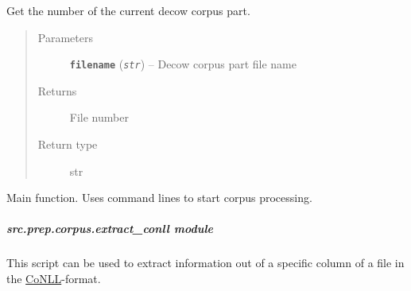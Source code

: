 \documentclass[letterpaper,10pt,english]{sphinxmanual}
\begin{document}
\begin{fulllineitems}
\label{src.prep.corpus:src.prep.corpus.convert_to_plain.get_file_number}
Get the number of the current decow corpus part.
\begin{quote}\begin{description}
\item[{Parameters}] \leavevmode
\textbf{\texttt{filename}} (\emph{\texttt{str}}) -- Decow corpus part file name

\item[{Returns}] \leavevmode
File number

\item[{Return type}] \leavevmode
str

\end{description}\end{quote}

\end{fulllineitems}


\begin{fulllineitems}
\label{src.prep.corpus:src.prep.corpus.convert_to_plain.main}
Main function. Uses command lines to start corpus processing.

\end{fulllineitems}



\subparagraph{src.prep.corpus.extract\_conll module}
\label{src.prep.corpus:src-prep-corpus-extract-conll-module}\label{src.prep.corpus:module-src.prep.corpus.extract_conll}
This script can be used to extract information out of a specific column of a file in the
\href{http://ilk.uvt.nl/conll/}{CoNLL}-format.
\end{document}
